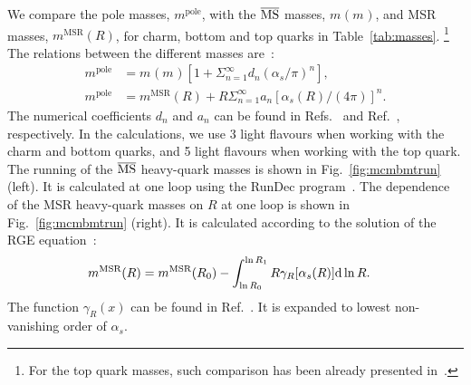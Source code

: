 \documentclass[12pt,a4paper]{article}
\newcommand{\msbar}{\ensuremath{\overline{\rm MS}}\xspace}
\newcommand{\polem}[1][]{\ensuremath{m_{#1}^{\text{pole}}}\xspace}
\newcommand{\msbarm}[1][]{\ensuremath{m_{#1}(m_{#1})}\xspace}
\newcommand{\msrm}[1][]{\ensuremath{m_{#1}^{\text{MSR}}}\xspace}
\begin{document}
We compare the pole masses, \polem, with the \msbar masses, \msbarm, and MSR masses, $\msrm(R)$, for charm, bottom and top quarks in Table~\ref{tab:masses}.%
\footnote{For the top quark masses, such comparison has been already presented in~\cite{Moch:2014tta}.}
 The relations between the different masses are~\cite{Gray:1990yh,Chetyrkin:1999qi,Melnikov:2000qh,Hoang:2008yj}:
\begin{equation}
\begin{aligned}
\polem &= {\msbarm} [ 1 + \Sigma^{\infty}_{n=1}d_n(\alpha_s/\pi)^n ],\\
\polem &= \msrm(R) + R\Sigma^{\infty}_{n=1}a_n[\alpha_s(R)/(4\pi)]^n.
\end{aligned}
\label{eq:massrelation}
\end{equation}
The numerical coefficients $d_n$ and $a_n$ can be found in Refs.~\cite{Gray:1990yh,Chetyrkin:1999qi,Melnikov:2000qh} and Ref.~\cite{Hoang:2008yj}, respectively.
In the calculations, we use 3 light flavours when working with the charm and bottom quarks, and 5 light flavours when working with the top quark.
The running of the \msbar heavy-quark masses is shown in Fig.~\ref{fig:mcmbmtrun} (left). It is calculated at one loop using the RunDec program~\cite{Schmidt:2012az}. The dependence of the MSR heavy-quark masses on $R$ at one loop is shown in Fig.~\ref{fig:mcmbmtrun} (right). 
It is calculated according to the solution of the RGE equation~\cite{Hoang:2008yj}:
\begin{equation}
\begin{aligned}
{\msrm}(R) &= {\msrm}(R_0) -\int^{\ln R_1}_{\ln R_0} R\gamma_R[\alpha_s(R)] {\rm d} \ln R.
\end{aligned}
\label{eq:massrunning}
\end{equation}
The function $\gamma_R(x)$ can be found in Ref.~\cite{Hoang:2008yj}. It is expanded to lowest non-vanishing order of $\alpha_s$.
\end{document}

